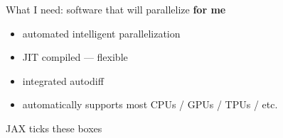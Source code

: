 \documentclass[
    xcolor={svgnames,dvipsnames},
    hyperref={colorlinks, citecolor=DeepPink4, linkcolor=DarkRed, urlcolor=DarkBlue}
    ]{beamer}  %
\newcommand{\1}{\mathbbm 1}
\begin{document}
\begin{frame}
    
    What I need: software that will parallelize \textbf{for me}

    \begin{itemize}
        \item automated intelligent parallelization
    \vspace{0.5em}
        \item JIT compiled  --- flexible
    \vspace{0.5em}
        \item integrated autodiff
    \vspace{0.5em}
        \item automatically supports most CPUs / GPUs / TPUs / etc.
    \end{itemize}

    \vspace{0.5em}
    \vspace{0.5em}
    JAX ticks these boxes

\end{frame}
\end{document}
